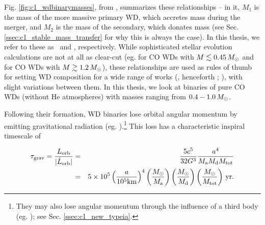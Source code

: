 Fig. \ref{fig:c1_wdbinarymasses}, from \cite{dan+12}, summarizes these relationships -- in it, $M_1$ is the mass of the more massive primary WD, which accretes mass during the merger, and $M_2$ is the mass of the secondary, which donates mass (see Sec. \ref{ssec:c1_stable_mass_transfer} for why this is always the case).  In this thesis, we refer to these as \Ma\ and \Md, respectively.  While sophisticated stellar evolution calculations are {\charles not at all as} clear-cut (eg. \citealt{ibent85, moros09} for CO WDs with $M\lesssim0.45\,\Msun$ and \citealt{hurlpt00} for CO WDs with $M\gtrsim1.2\,\Msun$), these relationships are used as rules of thumb for setting WD composition for a wide range of works (\citealt{loreig09}, henceforth \citeal{loreig09}; \citealt{rask+12,dan+12,dan+14}), with slight variations between them.  In this thesis, we look at binaries of pure CO WDs (without He atmospheres) with masses ranging from $0.4 - 1.0\,\Msun$.






Following their formation, WD binaries lose orbital angular momentum by emitting gravitational radiation (eg. \citealt{petem63}).\footnote{They may also lose angular momentum through the influence of a third body (eg. \citealt{katzd12}); see Sec. \ref{ssec:c1_new_typeia}.}  This loss has a characteristic inspiral timescale of \citep{segrcm97}

\begin{eqnarray}
\tau_{\mrm{grav}} = \frac{L_\mrm{orb}}{|\dot{L}_\mrm{orb}|} &=& \frac{5c^5}{32G^3}\frac{a^4}{\Ma\Md\Mtot}\nonumber \\
&=&5 \times 10^5 \left(\frac{a}{10^5 \mrm{km}}\right)^4 \left(\frac{\Msun}{\Ma}\right) \left(\frac{\Msun}{\Md}\right) \left(\frac{\Msun}{\Mtot}\right)\,\mrm{yr}.
\label{eq:c1_gravtimescale}
\end{eqnarray}

